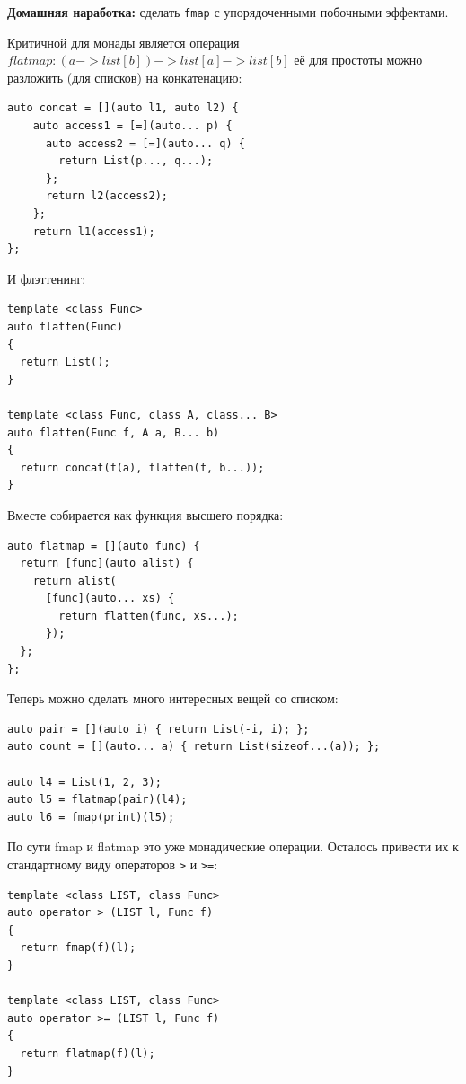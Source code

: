 \documentclass[a4paper,12pt,oneside]{book}
\newif\ifanswers
\begin{document}
\ifanswers
Правильный ответ: практически в любом. Внутри \lstinline!fmap! будет сгенерирован вызов конструктора списка, который берет на вход вызовы функций вывода.
\fi

\textbf{Домашняя наработка:} сделать \lstinline!fmap! с упорядоченными побочными эффектами.

Критичной для монады является операция $flatmap: (a -> list[b]) -> list[a] -> list[b]$ её для простоты можно разложить (для списков) на конкатенацию:

\begin{lstlisting}
auto concat = [](auto l1, auto l2) {
    auto access1 = [=](auto... p) {
      auto access2 = [=](auto... q) {
        return List(p..., q...);
      };
      return l2(access2);
    };
    return l1(access1);
};
\end{lstlisting}

И флэттенинг:
 
\begin{lstlisting}
template <class Func>
auto flatten(Func)
{
  return List(); 
}
 
template <class Func, class A, class... B>
auto flatten(Func f, A a, B... b)
{
  return concat(f(a), flatten(f, b...));
}
\end{lstlisting}
 
Вместе собирается как функция высшего порядка:

\begin{lstlisting}
auto flatmap = [](auto func) {
  return [func](auto alist) {
    return alist(
      [func](auto... xs) { 
        return flatten(func, xs...);  
      });
  };
};
\end{lstlisting}

Теперь можно сделать много интересных вещей со списком:
	
\begin{lstlisting}
auto pair = [](auto i) { return List(-i, i); };
auto count = [](auto... a) { return List(sizeof...(a)); };
 
auto l4 = List(1, 2, 3);
auto l5 = flatmap(pair)(l4);
auto l6 = fmap(print)(l5); 
\end{lstlisting}

По сути fmap и flatmap это уже монадические операции. Осталось привести их к стандартному виду операторов \lstinline!>! и \lstinline!>=!:

\begin{lstlisting}
template <class LIST, class Func>
auto operator > (LIST l, Func f)
{
  return fmap(f)(l);   
}
 
template <class LIST, class Func>
auto operator >= (LIST l, Func f)
{
  return flatmap(f)(l);   
}
\end{lstlisting}
\end{document}

